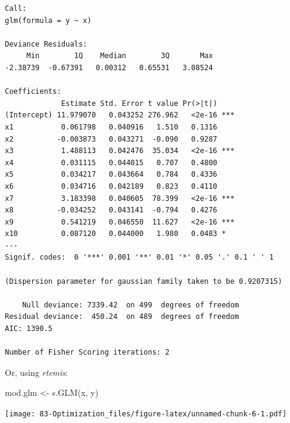 \documentclass[
]{book}
\newenvironment{Shaded}{\begin{snugshade}}{\end{snugshade}}
\newcommand{\FunctionTok}[1]{\textcolor[rgb]{0.00,0.00,0.00}{#1}}
\newcommand{\NormalTok}[1]{#1}
\newcommand{\OtherTok}[1]{\textcolor[rgb]{0.56,0.35,0.01}{#1}}
\newcommand{\SpecialCharTok}[1]{\textcolor[rgb]{0.00,0.00,0.00}{#1}}
\begin{document}
\begin{verbatim}
Call:
glm(formula = y ~ x)

Deviance Residuals: 
     Min        1Q    Median        3Q       Max  
-2.38739  -0.67391   0.00312   0.65531   3.08524  

Coefficients:
             Estimate Std. Error t value Pr(>|t|)    
(Intercept) 11.979070   0.043252 276.962   <2e-16 ***
x1           0.061798   0.040916   1.510   0.1316    
x2          -0.003873   0.043271  -0.090   0.9287    
x3           1.488113   0.042476  35.034   <2e-16 ***
x4           0.031115   0.044015   0.707   0.4800    
x5           0.034217   0.043664   0.784   0.4336    
x6           0.034716   0.042189   0.823   0.4110    
x7           3.183398   0.040605  78.399   <2e-16 ***
x8          -0.034252   0.043141  -0.794   0.4276    
x9           0.541219   0.046550  11.627   <2e-16 ***
x10          0.087120   0.044000   1.980   0.0483 *  
---
Signif. codes:  0 '***' 0.001 '**' 0.01 '*' 0.05 '.' 0.1 ' ' 1

(Dispersion parameter for gaussian family taken to be 0.9207315)

    Null deviance: 7339.42  on 499  degrees of freedom
Residual deviance:  450.24  on 489  degrees of freedom
AIC: 1390.5

Number of Fisher Scoring iterations: 2
\end{verbatim}

Or, using \emph{rtemis}:

\begin{Shaded}
\begin{Highlighting}[]
\NormalTok{mod.glm }\OtherTok{\textless{}{-}} \FunctionTok{s.GLM}\NormalTok{(x, y)}
\end{Highlighting}
\end{Shaded}

\texttt{[image: 83-Optimization\_files/figure-latex/unnamed-chunk-6-1.pdf]}

\begin{Shaded}
\end{Shaded}
\end{document}
